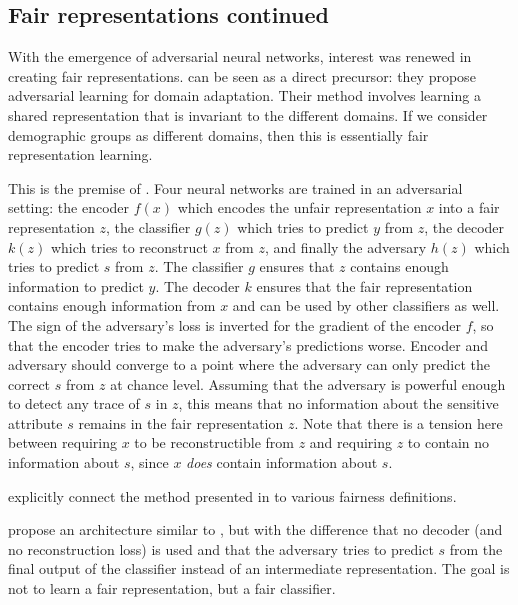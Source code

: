 \subsection{Fair representations continued} With the emergence of adversarial neural networks,
interest was renewed in creating fair representations. \citet{ganin2016domain} can be seen as a
direct precursor: they propose adversarial learning for domain adaptation. Their method involves
learning a shared representation that is invariant to the different domains. If we consider
demographic groups as different domains, then this is essentially fair representation learning.

This is the premise of \citet{edwards2016censoring}. Four neural networks are trained in an
adversarial setting: the encoder \(f(x)\) which encodes the unfair representation \(x\) into a fair
representation \(z\), the classifier \(g(z)\) which tries to predict \(y\) from \(z\), the decoder
\(k(z)\) which tries to reconstruct \(x\) from \(z\), and finally the adversary \(h(z)\) which
tries to predict \(s\) from \(z\). The classifier \(g\) ensures that \(z\) contains enough
information to predict \(y\). The decoder \(k\) ensures that the fair representation contains
enough information from \(x\) and can be used by other classifiers as well. The sign of the
adversary's loss is inverted for the gradient of the encoder \(f\), so that the encoder tries to
make the adversary's predictions worse. Encoder and adversary should converge to a point where the
adversary can only predict the correct \(s\) from \(z\) at chance level. Assuming that the
adversary is powerful enough to detect any trace of \(s\) in \(z\), this means that no information
about the sensitive attribute \(s\) remains in the fair representation \(z\). Note that there is a
tension here between requiring \(x\) to be reconstructible from \(z\) and requiring \(z\) to
contain no information about \(s\), since \(x\) \emph{does} contain information about \(s\).

\citet{beutel2017data} explicitly connect the method presented in \citet{edwards2016censoring} to
various fairness definitions.

\citet{zhang2018mitigating} propose an architecture similar to \citet{edwards2016censoring}, but
with the difference that no decoder (and no reconstruction loss) is used and that the adversary
tries to predict \(s\) from the final output of the classifier instead of an intermediate
representation. The goal is not to learn a fair representation, but a fair classifier.

